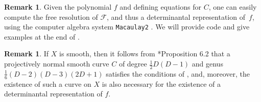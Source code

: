 \documentclass[a4paper,10pt]{amsart}
\theoremstyle{definition}
\newtheorem{rem}[Def]{Remark}
\theoremstyle{plain}
\newcommand{\cF}{{\mathcal F}}
\begin{document}
\begin{rem}\label{rem:computedetrep}
    Given the polynomial $f$ and defining equations for $C$, one can easily compute the free resolution of $\cF$, and thus a determinantal representation of~$f$, using the computer algebra system \texttt{Macaulay2} \cite{M2}. We will provide code and give examples at the end of .
\end{rem}
\begin{rem}
    If $X$ is smooth, then it follows from \cite{Beauville2000DetHypSurf}*{Proposition 6.2} that a projectively normal smooth curve $C$ of degree $\frac{1}{2}D(D-1)$ and genus $\frac{1}{6}(D-2)(D-3)(2D+1)$ satisfies the conditions of , and, moreover, the existence of such a curve on $X$ is also necessary for the existence of a determinantal representation of $f$.
\end{rem}
\end{document}
